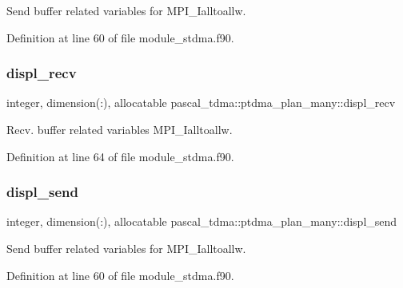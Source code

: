 Send buffer related variables for M\+P\+I\+\_\+\+Ialltoallw. 



Definition at line 60 of file module\+\_\+stdma.\+f90.

\mbox{\label{structpascal__tdma_1_1ptdma__plan__many_a1801ea6bbff319dd594a5e993bc5d542}} 
\subsubsection{\texorpdfstring{displ\_recv}{displ\_recv}}
{\footnotesize\ttfamily integer, dimension(\+:), allocatable pascal\+\_\+tdma\+::ptdma\+\_\+plan\+\_\+many\+::displ\+\_\+recv}



Recv. buffer related variables M\+P\+I\+\_\+\+Ialltoallw. 



Definition at line 64 of file module\+\_\+stdma.\+f90.

\mbox{\label{structpascal__tdma_1_1ptdma__plan__many_a1c7544758e7ccfcd3b07e91caf0d8f3d}} 
\subsubsection{\texorpdfstring{displ\_send}{displ\_send}}
{\footnotesize\ttfamily integer, dimension(\+:), allocatable pascal\+\_\+tdma\+::ptdma\+\_\+plan\+\_\+many\+::displ\+\_\+send}



Send buffer related variables for M\+P\+I\+\_\+\+Ialltoallw. 



Definition at line 60 of file module\+\_\+stdma.\+f90.

\mbox{\label{structpascal__tdma_1_1ptdma__plan__many_ad94248e2aa0653f151f0575d62d6fff7}} 
